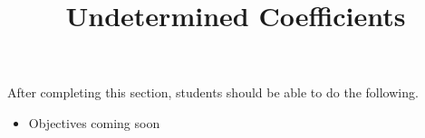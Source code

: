 \documentclass{ximera}
\title{Undetermined Coefficients}
\begin{document}
\begin{abstract}
\end{abstract}

\maketitle

\begin{sectionOutcomes}

After completing this section, students should be able to do the following.

\begin{itemize}
	\item Objectives coming soon
\end{itemize}

\end{sectionOutcomes}
\end{document}
